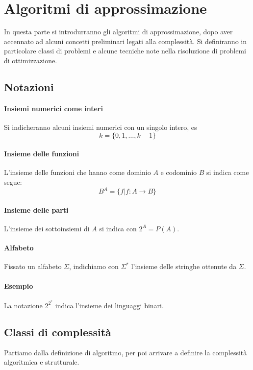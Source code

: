 \section{Algoritmi di approssimazione}
In questa parte si introdurranno gli algoritmi di approssimazione, 
dopo aver accennato ad alcuni concetti preliminari legati alla complessità.
Si definiranno in particolare classi di problemi e alcune 
tecniche note nella risoluzione di problemi di ottimizzazione.

\subsection{Notazioni}

\paragraph{Insiemi numerici come interi}
Si indicheranno alcuni insiemi numerici con un singolo intero, 
es $$k = \{0, 1, \dots, k-1\}$$

\paragraph{Insieme delle funzioni} L'insieme delle funzioni che hanno come dominio $A$ e codominio $B$ si indica come segue: 
$$B^A = \{ f | f : A \rightarrow B\}$$

\paragraph{Insieme delle parti} L'insieme dei sottoinsiemi di $A$ si indica con $2^A = P(A)$.

\paragraph{Alfabeto} Fissato un alfabeto $\Sigma$, indichiamo con $\Sigma^*$ l'insieme delle stringhe ottenute da 
$\Sigma$.

\paragraph{Esempio}
La notazione $2^{2^*}$ indica l'insieme dei linguaggi binari.

\subsection{Classi di complessità}
Partiamo dalla definizione di algoritmo, per poi arrivare a definire la 
complessità algoritmica e strutturale.
